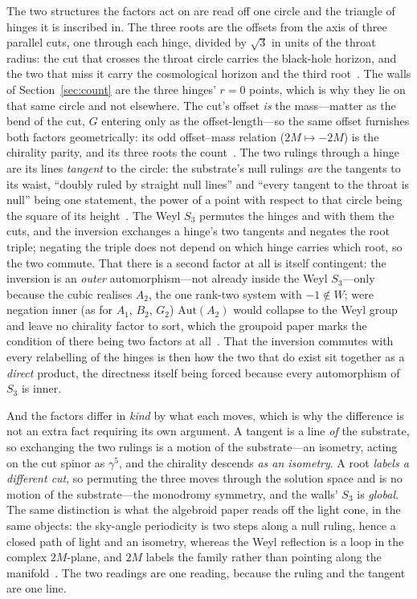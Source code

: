 \documentclass[11pt]{article}
\begin{document}
The two structures the factors act on are read off one circle and the triangle of hinges it is inscribed in. The three roots are the offsets from the axis of three parallel cuts, one through each hinge, divided by $\sqrt3$ in units of the throat radius: the cut that crosses the throat circle carries the black-hole horizon, and the two that miss it carry the cosmological horizon and the third root~\cite{JanzenSlicing}. The walls of Section~\ref{sec:count} are the three hinges' $r=0$ points, which is why they lie on that same circle and not elsewhere. The cut's offset \emph{is} the mass---matter as the bend of the cut, $G$ entering only as the offset-length---so the same offset furnishes both factors geometrically: its odd offset--mass relation ($2M\mapsto-2M$) is the chirality parity, and its three roots the count~\cite{JanzenOperator}. The two rulings through a hinge are its lines \emph{tangent} to the circle: the substrate's null rulings \emph{are} the tangents to its waist, ``doubly ruled by straight null lines'' and ``every tangent to the throat is null'' being one statement, the power of a point with respect to that circle being the square of its height~\cite{JanzenGeometricCore}. The Weyl $S_3$ permutes the hinges and with them the cuts, and the inversion exchanges a hinge's two tangents and negates the root triple; negating the triple does not depend on which hinge carries which root, so the two commute. That there is a second factor at all is itself contingent: the inversion is an \emph{outer} automorphism---not already inside the Weyl $S_3$---only because the cubic realises $A_2$, the one rank-two system with $-1\notin W$; were negation inner (as for $A_1$, $B_2$, $G_2$) $\mathrm{Aut}(A_2)$ would collapse to the Weyl group and leave no chirality factor to sort, which the groupoid paper marks the condition of there being two factors at all~\cite{JanzenGroupoid}. That the inversion commutes with every relabelling of the hinges is then how the two that do exist sit together as a \emph{direct} product, the directness itself being forced because every automorphism of $S_3$ is inner.

And the factors differ in \emph{kind} by what each moves, which is why the difference is not an extra fact requiring its own argument. A tangent is a line \emph{of} the substrate, so exchanging the two rulings is a motion of the substrate---an isometry, acting on the cut spinor as $\gamma^5$, and the chirality descends \emph{as an isometry}. A root \emph{labels a different cut}, so permuting the three moves through the solution space and is no motion of the substrate---the
monodromy symmetry, and the walls' $S_3$ is \emph{global}. The same distinction is what the algebroid paper reads off the light cone, in the same objects: the sky-angle periodicity is two steps along a null ruling, hence a closed path of light and an isometry, whereas the Weyl reflection is a loop in the complex $2M$-plane, and $2M$ labels the family rather than pointing along the manifold~\cite{JanzenAlgebroid}. The two readings are one reading, because the ruling and the tangent are one line.
\end{document}
